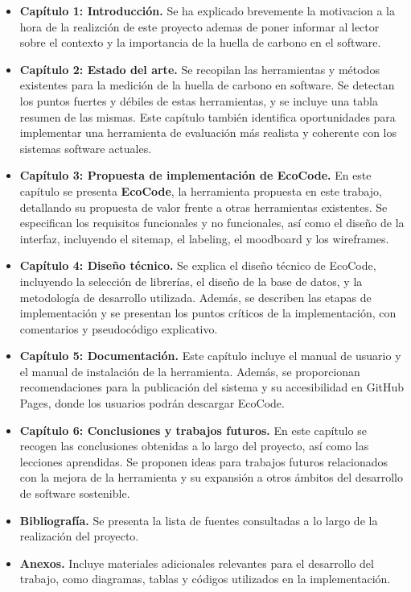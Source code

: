\documentclass[12pt,a4paper]{report}
\begin{document}
\begin{itemize}
  \item \textbf{Capítulo 1: Introducción.} Se ha explicado brevemente la motivacion a la hora de la realizción de este proyecto ademas de poner informar al lector sobre el contexto y la importancia de la huella
        de carbono en el software.
  \item \textbf{Capítulo 2: Estado del arte.} Se recopilan las herramientas y métodos existentes para la medición de la huella de carbono en software. Se detectan los puntos fuertes y débiles de estas herramientas, y se incluye una tabla resumen de las mismas. Este capítulo también identifica oportunidades para implementar una herramienta de evaluación más realista y coherente con los sistemas software actuales.
  \item \textbf{Capítulo 3: Propuesta de implementación de EcoCode.} En este capítulo se presenta \textbf{EcoCode}, la herramienta propuesta en este trabajo, detallando su propuesta de valor frente a otras herramientas existentes. Se especifican los requisitos funcionales y no funcionales, así como el diseño de la interfaz, incluyendo el sitemap, el labeling, el moodboard y los wireframes.
  \item \textbf{Capítulo 4: Diseño técnico.} Se explica el diseño técnico de EcoCode, incluyendo la selección de librerías, el diseño de la base de datos, y la metodología de desarrollo utilizada. Además, se describen las etapas de implementación y se presentan los puntos críticos de la implementación, con comentarios y pseudocódigo explicativo.
  \item \textbf{Capítulo 5: Documentación.} Este capítulo incluye el manual de usuario y el manual de instalación de la herramienta. Además, se proporcionan recomendaciones para la publicación del sistema y su accesibilidad en GitHub Pages, donde los usuarios podrán descargar EcoCode.
  \item \textbf{Capítulo 6: Conclusiones y trabajos futuros.} En este capítulo se recogen las conclusiones obtenidas a lo largo del proyecto, así como las lecciones aprendidas. Se proponen ideas para trabajos futuros relacionados con la mejora de la herramienta y su expansión a otros ámbitos del desarrollo de software sostenible.
  \item \textbf{Bibliografía.} Se presenta la lista de fuentes consultadas a lo largo de la realización del proyecto.
  \item \textbf{Anexos.} Incluye materiales adicionales relevantes para el desarrollo del trabajo, como diagramas, tablas y códigos utilizados en la implementación.
\end{itemize}
\end{document}

